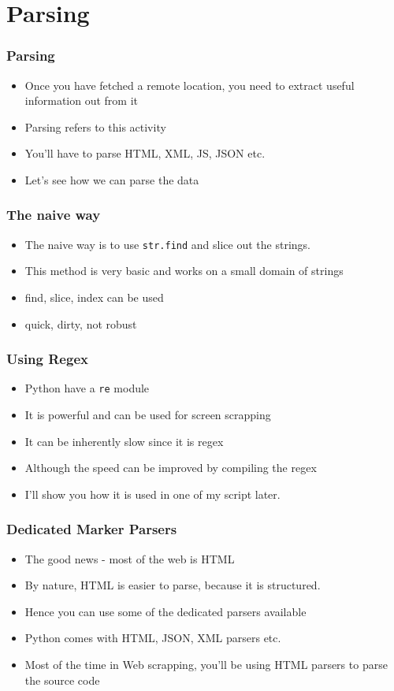\documentclass{beamer}
\begin{document}
\section{Parsing}
\label{sec-4}
\begin{frame}
\frametitle{Parsing}
\label{sec-4_1}


\begin{itemize}
\item Once you have fetched a remote location, you need to extract useful information out from it
\item Parsing refers to this activity
\item You'll have to parse HTML, XML, JS, JSON etc.
\item Let's see how we can parse the data
\end{itemize}
\end{frame}
\begin{frame}
\frametitle{The naive way}
\label{sec-4_2}


\begin{itemize}
\item The naive way is to use \texttt{str.find} and slice out the strings.
\item This method is very basic and works on a small domain of strings
\item find, slice, index can be used
\item quick, dirty, not robust
\end{itemize}
\end{frame}
\begin{frame}
\frametitle{Using Regex}
\label{sec-4_3}


\begin{itemize}
\item Python have a \texttt{re} module
\item It is powerful and can be used for screen scrapping
\item It can be inherently slow since it is regex
\item Although the speed can be improved by compiling the regex
\item I'll show you how it is used in one of my script later.
\end{itemize}
   
\end{frame}
\begin{frame}
\frametitle{Dedicated Marker Parsers}
\label{sec-4_4}


\begin{itemize}
\item The good news - most of the web is HTML
\item By nature, HTML is easier to parse, because it is structured.
\item Hence you can use some of the dedicated parsers available
\item Python comes with HTML, JSON, XML parsers etc.
\item Most of the time in Web scrapping, you'll be using HTML parsers to parse the source code
\end{itemize}
\end{frame}
\end{document}
